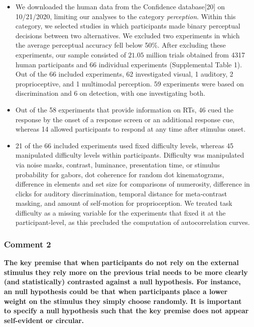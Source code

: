 \documentclass[
]{article}
\begin{document}
\begin{itemize}
\item
  We downloaded the human data from the Confidence database{[}20{]} on
  10/21/2020, limiting our analyses to the category \emph{perception}.
  Within this category, we selected studies in which participants made
  binary perceptual decisions between two alternatives. We excluded two
  experiments in which the average perceptual accuracy fell below 50\%.
  After excluding these experiments, our sample consisted of \(21.05\)
  million trials obtained from 4317 human participants and 66 individual
  experiments (Supplemental Table 1). Out of the 66 included
  experiments, 62 investigated visual, 1 auditory, 2 proprioceptive, and
  1 multimodal perception. 59 experiments were based on discrimination
  and 6 on detection, with one investigating both.
\item
  Out of the 58 experiments that provide information on RTs, 46 cued the
  response by the onset of a response screen or an additional response
  cue, whereas 14 allowed participants to respond at any time after
  stimulus onset.
\item
  21 of the 66 included experiments used fixed difficulty levels,
  whereas 45 manipulated difficulty levels within participants.
  Difficulty was manipulated via noise masks, contrast, luminance,
  presentation time, or stimulus probability for gabors, dot coherence
  for random dot kinematograms, difference in elements and set size for
  comparisons of numerosity, difference in clicks for auditory
  discrimination, temporal distance for meta-contrast masking, and
  amount of self-motion for proprioception. We treated task difficulty
  as a missing variable for the experiments that fixed it at the
  participant-level, as this precluded the computation of
  autocorrelation curves.
\end{itemize}

\hypertarget{comment-2-1}{%
\subsubsection{Comment 2}\label{comment-2-1}}

\textbf{The key premise that when participants do not rely on the
external stimulus they rely more on the previous trial needs to be more
clearly (and statistically) contrasted against a null hypothesis. For
instance, an null hypothesis could be that when participants place a
lower weight on the stimulus they simply choose randomly. It is
important to specify a null hypothesis such that the key premise does
not appear self-evident or circular.}
\end{document}

